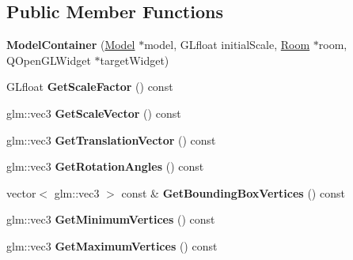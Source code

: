 \subsection*{Public Member Functions}
\begin{DoxyCompactItemize}
\item 
\hypertarget{class_model_container_a5145271e175fb5434c5209d170a2749d}{}{\bfseries Model\+Container} (\hyperlink{class_model}{Model} $\ast$model, G\+Lfloat initial\+Scale, \hyperlink{class_room}{Room} $\ast$room, Q\+Open\+G\+L\+Widget $\ast$target\+Widget)\label{class_model_container_a5145271e175fb5434c5209d170a2749d}

\item 
\hypertarget{class_model_container_ad403022f0e44b40ae6576b1c9454263e}{}G\+Lfloat {\bfseries Get\+Scale\+Factor} () const \label{class_model_container_ad403022f0e44b40ae6576b1c9454263e}

\item 
\hypertarget{class_model_container_ae859dd4743c5c4dcd3ed4044dfe60ffe}{}glm\+::vec3 {\bfseries Get\+Scale\+Vector} () const \label{class_model_container_ae859dd4743c5c4dcd3ed4044dfe60ffe}

\item 
\hypertarget{class_model_container_ad76f4a36da8b3696089f2843382cf9fb}{}glm\+::vec3 {\bfseries Get\+Translation\+Vector} () const \label{class_model_container_ad76f4a36da8b3696089f2843382cf9fb}

\item 
\hypertarget{class_model_container_a1346377aa22a8e763475cc868e7b085c}{}glm\+::vec3 {\bfseries Get\+Rotation\+Angles} () const \label{class_model_container_a1346377aa22a8e763475cc868e7b085c}

\item 
\hypertarget{class_model_container_a14d2a1daa39d7f051a0022b577b8759e}{}vector$<$ glm\+::vec3 $>$ const \& {\bfseries Get\+Bounding\+Box\+Vertices} () const \label{class_model_container_a14d2a1daa39d7f051a0022b577b8759e}

\item 
\hypertarget{class_model_container_a5d5e757812e3c6d26b7217618f52680d}{}glm\+::vec3 {\bfseries Get\+Minimum\+Vertices} () const \label{class_model_container_a5d5e757812e3c6d26b7217618f52680d}

\item 
\hypertarget{class_model_container_af5b5265648933d3effb2e75c69412290}{}glm\+::vec3 {\bfseries Get\+Maximum\+Vertices} () const \label{class_model_container_af5b5265648933d3effb2e75c69412290}


\end{DoxyCompactItemize}
